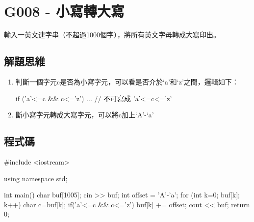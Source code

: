 \section{G008 - 小寫轉大寫}
輸入一英文連字串（不超過1000個字），將所有英文字母轉成大寫印出。

\subsection{解題思維}
\begin{enumerate}
	\item 判斷一個字元c是否為小寫字元，可以看是否介於`a'和`z'之間，邏輯如下：
		\begin{inside}
			if ('a'<=c && c<='z') { ... } // 不可寫成 'a'<=c<='z'
		\end{inside}
	\item 斷小寫字元轉成大寫字元，可以將c加上`A'-`a'
\end{enumerate}

\subsection{程式碼}
\begin{cppcode}
#include <iostream>

using namespace std;

int main()
{
	char buf[1005];
	cin >> buf;
	int offset = 'A'-'a';
	for (int k=0; buf[k]; k++) {
		char c=buf[k];
		if('a'<=c && c<='z') buf[k] += offset;
	}
	cout << buf;
	return 0;
}
\end{cppcode}
